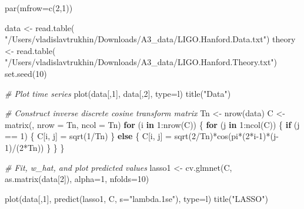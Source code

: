\documentclass[
]{article}
\newenvironment{Shaded}{\begin{snugshade}}{\end{snugshade}}
\newcommand{\AttributeTok}[1]{\textcolor[rgb]{0.77,0.63,0.00}{#1}}
\newcommand{\CommentTok}[1]{\textcolor[rgb]{0.56,0.35,0.01}{\textit{#1}}}
\newcommand{\ControlFlowTok}[1]{\textcolor[rgb]{0.13,0.29,0.53}{\textbf{#1}}}
\newcommand{\DecValTok}[1]{\textcolor[rgb]{0.00,0.00,0.81}{#1}}
\newcommand{\FunctionTok}[1]{\textcolor[rgb]{0.00,0.00,0.00}{#1}}
\newcommand{\NormalTok}[1]{#1}
\newcommand{\OtherTok}[1]{\textcolor[rgb]{0.56,0.35,0.01}{#1}}
\newcommand{\SpecialCharTok}[1]{\textcolor[rgb]{0.00,0.00,0.00}{#1}}
\newcommand{\StringTok}[1]{\textcolor[rgb]{0.31,0.60,0.02}{#1}}
\begin{document}
\begin{Shaded}
\begin{Highlighting}[]
\FunctionTok{par}\NormalTok{(}\AttributeTok{mfrow=}\FunctionTok{c}\NormalTok{(}\DecValTok{2}\NormalTok{,}\DecValTok{1}\NormalTok{))}

\NormalTok{data }\OtherTok{\textless{}{-}} \FunctionTok{read.table}\NormalTok{(}
            \StringTok{"/Users/vladislavtrukhin/Downloads/A3\_data/LIGO.Hanford.Data.txt"}\NormalTok{)}
\NormalTok{theory }\OtherTok{\textless{}{-}} \FunctionTok{read.table}\NormalTok{(}
            \StringTok{"/Users/vladislavtrukhin/Downloads/A3\_data/LIGO.Hanford.Theory.txt"}\NormalTok{)}
\FunctionTok{set.seed}\NormalTok{(}\DecValTok{10}\NormalTok{)}

\CommentTok{\# Plot time series}
\FunctionTok{plot}\NormalTok{(data[,}\DecValTok{1}\NormalTok{], data[,}\DecValTok{2}\NormalTok{], }\AttributeTok{type=}\StringTok{\textquotesingle{}l\textquotesingle{}}\NormalTok{)}
\FunctionTok{title}\NormalTok{(}\StringTok{"Data"}\NormalTok{)}

\CommentTok{\# Construct inverse discrete cosine transform matrix}
\NormalTok{Tn }\OtherTok{\textless{}{-}} \FunctionTok{nrow}\NormalTok{(data)}
\NormalTok{C }\OtherTok{\textless{}{-}} \FunctionTok{matrix}\NormalTok{(, }\AttributeTok{nrow =}\NormalTok{ Tn, }\AttributeTok{ncol =}\NormalTok{ Tn)}
\ControlFlowTok{for}\NormalTok{ (i }\ControlFlowTok{in} \DecValTok{1}\SpecialCharTok{:}\FunctionTok{nrow}\NormalTok{(C)) \{}
  \ControlFlowTok{for}\NormalTok{ (j }\ControlFlowTok{in} \DecValTok{1}\SpecialCharTok{:}\FunctionTok{ncol}\NormalTok{(C)) \{}
    \ControlFlowTok{if}\NormalTok{ (j }\SpecialCharTok{==} \DecValTok{1}\NormalTok{) \{}
\NormalTok{      C[i, j] }\OtherTok{=} \FunctionTok{sqrt}\NormalTok{(}\DecValTok{1}\SpecialCharTok{/}\NormalTok{Tn)}
\NormalTok{    \} }\ControlFlowTok{else}\NormalTok{ \{}
\NormalTok{      C[i, j] }\OtherTok{=} \FunctionTok{sqrt}\NormalTok{(}\DecValTok{2}\SpecialCharTok{/}\NormalTok{Tn)}\SpecialCharTok{*}\FunctionTok{cos}\NormalTok{(pi}\SpecialCharTok{*}\NormalTok{(}\DecValTok{2}\SpecialCharTok{*}\NormalTok{i}\DecValTok{{-}1}\NormalTok{)}\SpecialCharTok{*}\NormalTok{(j}\DecValTok{{-}1}\NormalTok{)}\SpecialCharTok{/}\NormalTok{(}\DecValTok{2}\SpecialCharTok{*}\NormalTok{Tn))}
\NormalTok{    \}}
\NormalTok{  \}}
\NormalTok{\}}

\CommentTok{\# Fit, w\_hat, and plot predicted values}
\NormalTok{lasso1 }\OtherTok{\textless{}{-}} \FunctionTok{cv.glmnet}\NormalTok{(C, }\FunctionTok{as.matrix}\NormalTok{(data[}\DecValTok{2}\NormalTok{]), }\AttributeTok{alpha=}\DecValTok{1}\NormalTok{, }\AttributeTok{nfolds=}\DecValTok{10}\NormalTok{)}

\FunctionTok{plot}\NormalTok{(data[,}\DecValTok{1}\NormalTok{], }\FunctionTok{predict}\NormalTok{(lasso1, C, }\AttributeTok{s=}\StringTok{"lambda.1se"}\NormalTok{), }\AttributeTok{type=}\StringTok{\textquotesingle{}l\textquotesingle{}}\NormalTok{)}
\FunctionTok{title}\NormalTok{(}\StringTok{"LASSO"}\NormalTok{)}
\end{Highlighting}
\end{Shaded}
\end{document}
